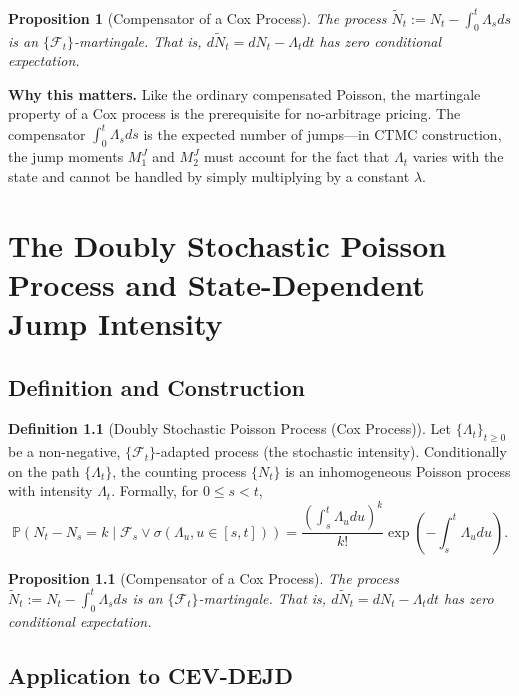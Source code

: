 \documentclass[11pt,a4paper,openany]{book}
\theoremstyle{definition}
\newtheorem{definition}{Definition}[chapter]
\theoremstyle{plain}
\newtheorem{proposition}[theorem]{Proposition}
\theoremstyle{remark}
\newcommand{\1}{\mathbbm{1}}
\newcommand{\F}{\mathcal{F}}
\newcommand{\Pbb}{\mathbb{P}}
\begin{document}
\begin{proposition}[Compensator of a Cox Process]
The process $\widetilde{N}_{t} := N_{t} - \int_{0}^{t} \Lambda_{s} ds$ is an $\{\F_{t}\}$-martingale. That is, $d\widetilde{N}_{t} = dN_{t} - \Lambda_{t} dt$ has zero conditional expectation.
\end{proposition}

\medskip
\noindent\textbf{Why this matters.} Like the ordinary compensated Poisson, the martingale property of a Cox process is the prerequisite for no-arbitrage pricing. The compensator $\int_0^t \Lambda_s ds$ is the expected number of jumps---in CTMC construction, the jump moments $M_1^J$ and $M_2^J$ must account for the fact that $\Lambda_t$ varies with the state and cannot be handled by simply multiplying by a constant $\lambda$.

\chapter{The Doubly Stochastic Poisson Process and State-Dependent Jump Intensity}

\section{Definition and Construction}

\begin{definition}[Doubly Stochastic Poisson Process (Cox Process)]
Let $\{\Lambda_{t}\}_{t \geq 0}$ be a non-negative, $\{\F_{t}\}$-adapted process (the stochastic intensity). Conditionally on the path $\{\Lambda_{t}\}$, the counting process $\{N_{t}\}$ is an inhomogeneous Poisson process with intensity $\Lambda_{t}$. Formally, for $0 \leq s < t$,
\[
\Pbb(N_{t} - N_{s} = k \mid \F_{s} \vee \sigma(\Lambda_{u}, u \in [s,t])) = \frac{(\int_{s}^{t} \Lambda_{u} du)^{k}}{k!} \exp\left(-\int_{s}^{t} \Lambda_{u} du\right).
\]
\end{definition}

\begin{proposition}[Compensator of a Cox Process]
The process $\widetilde{N}_{t} := N_{t} - \int_{0}^{t} \Lambda_{s} ds$ is an $\{\F_{t}\}$-martingale. That is, $d\widetilde{N}_{t} = dN_{t} - \Lambda_{t} dt$ has zero conditional expectation.
\end{proposition}

\section{Application to CEV-DEJD}
\end{document}
